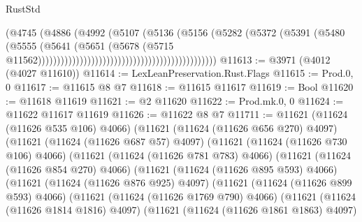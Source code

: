 \begin{lexlean}{RustStd}
\begin{coremodule}
{\begin{coremodule}
{{{{{{{{{{{{{{{{{{{{{{{{{{{{{{{{{{{{{{{{{{{{{{{{{{{{{{{{{{{{{{{{{{{{                                                                    (@4745
                                                                      (@4886
                                                                        (@4992
                                                                          (@5107
                                                                            (@5136
                                                                              (@5156
                                                                                (@5282
                                                                                  (@5372
                                                                                    (@5391
                                                                                      (@5480
                                                                                        (@5555
                                                                                          (@5641
                                                                                            (@5651
                                                                                              (@5678
                                                                                                (@5715
                                                                                                  @11562)))))))))))))))))))))))))))))))))))))))))))))))
@11613 := @3971 (@4012 (@4027 @11610))
@11614 := LexLeanPreservation.Rust.Flags
@11615 := Prod.{0, 0}
@11617 := @11615 @8 @7
@11618 := @11615 @11617
@11619 := Bool
@11620 := @11618 @11619
@11621 := @2 @11620
@11622 := Prod.mk.{0, 0}
@11624 := @11622 @11617 @11619
@11626 := @11622 @8 @7
@11711 := @11621
    (@11624 (@11626 @535 @106) @4066)
    (@11621
      (@11624 (@11626 @656 @270) @4097)
      (@11621
        (@11624 (@11626 @687 @57) @4097)
        (@11621
          (@11624 (@11626 @730 @106) @4066)
          (@11621
            (@11624 (@11626 @781 @783) @4066)
            (@11621
              (@11624 (@11626 @854 @270) @4066)
              (@11621
                (@11624 (@11626 @895 @593) @4066)
                (@11621
                  (@11624 (@11626 @876 @925) @4097)
                  (@11621
                    (@11624 (@11626 @899 @593) @4066)
                    (@11621
                      (@11624 (@11626 @1769 @790) @4066)
                      (@11621
                        (@11624 (@11626 @1814 @1816) @4097)
                        (@11621
                          (@11624 (@11626 @1861 @1863) @4097)
}}}}}}}}}}}}}}}}}}}}}}}}}}}}}}}}}}}}}}}}}}}}}}}}}}}}}}}}}}}}}}}}}}}}
\end{coremodule}}
\end{coremodule}
\end{lexlean}
